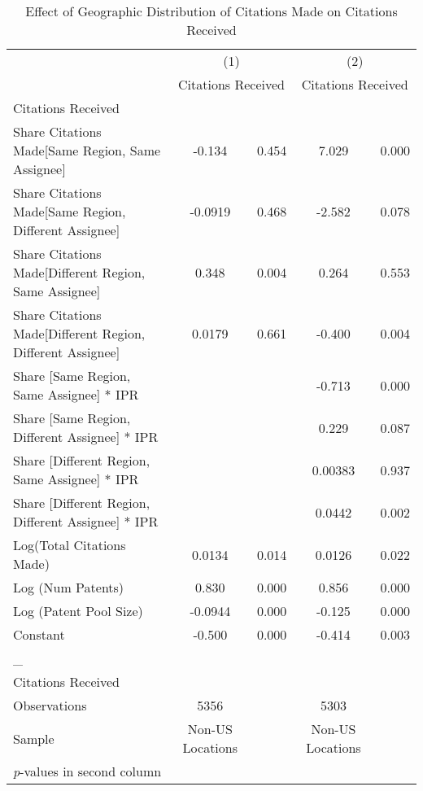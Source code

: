 {
\begin{longtable}{l*{2}{cc}}
\caption{Effect of Geographic Distribution of Citations Made on Citations Received \label{model36}}\\
\hline\hline\endfirsthead\hline\endhead\hline\endfoot\endlastfoot
                &\multicolumn{2}{c}{(1)}&\multicolumn{2}{c}{(2)}\\
                &\multicolumn{2}{c}{Citations Received}&\multicolumn{2}{c}{Citations Received}\\
\hline
Citations Received&         &         &         &         \\
Share Citations Made[Same Region, Same Assignee]&   -0.134&    0.454&    7.029&    0.000\\
Share Citations Made[Same Region, Different Assignee]&  -0.0919&    0.468&   -2.582&    0.078\\
Share Citations Made[Different Region, Same Assignee]&    0.348&    0.004&    0.264&    0.553\\
Share Citations Made[Different Region, Different Assignee]&   0.0179&    0.661&   -0.400&    0.004\\
Share [Same Region, Same Assignee] * IPR&         &         &   -0.713&    0.000\\
Share [Same Region, Different Assignee] * IPR&         &         &    0.229&    0.087\\
Share [Different Region, Same Assignee] * IPR&         &         &  0.00383&    0.937\\
Share [Different Region, Different Assignee] * IPR&         &         &   0.0442&    0.002\\
Log(Total Citations Made)&   0.0134&    0.014&   0.0126&    0.022\\
Log (Num Patents)&    0.830&    0.000&    0.856&    0.000\\
Log (Patent Pool Size)&  -0.0944&    0.000&   -0.125&    0.000\\
Constant        &   -0.500&    0.000&   -0.414&    0.003\\
\hline
\_               &         &         &         &         \\
Citations Received&         &         &         &         \\
\hline
Observations    &     5356&         &     5303&         \\
Sample          &Non-US Locations&         &Non-US Locations&         \\
\hline\hline
\multicolumn{5}{l}{\footnotesize \textit{p}-values in second column}\\
\end{longtable}
}
